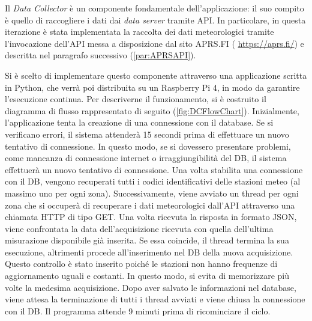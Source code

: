 Il \textit{Data Collector} è un componente fondamentale dell'applicazione: il suo compito è quello di raccogliere i dati dai \textit{data server} tramite API. In particolare, in questa iterazione è stata implementata la raccolta dei dati meteorologici tramite l'invocazione dell'API messa a disposizione dal sito APRS.FI ( \url{https://aprs.fi/}) e descritta nel paragrafo successivo (\ref{par:APRSAPI}). 

Si è scelto di implementare questo componente attraverso una applicazione scritta in Python, che verrà poi distribuita su un Raspberry Pi 4, in modo da garantire l'esecuzione continua. Per descriverne il funzionamento, si è costruito il diagramma di flusso rappresentato di seguito (\Fig\ref{fig:DCFlowChart}). Inizialmente, l'applicazione tenta la creazione di una connessione con il database. Se si verificano errori, il sistema attenderà 15 secondi prima di effettuare un nuovo tentativo di connessione. In questo modo, se si dovessero presentare problemi, come mancanza di connessione internet o irraggiungibilità del DB, il sistema effettuerà un nuovo tentativo di connessione. Una volta stabilita una connessione con il DB, vengono recuperati tutti i codici identificativi delle stazioni meteo (al massimo uno per ogni zona). Successivamente, viene avviato un thread per ogni zona che si occuperà di recuperare i dati meteorologici dall'API attraverso una chiamata HTTP di tipo GET. Una volta ricevuta la risposta in formato JSON, viene confrontata la data dell'acquisizione ricevuta con quella dell'ultima misurazione disponibile già inserita. Se essa coincide, il thread termina la sua esecuzione, altrimenti procede all'inserimento nel DB della nuova acquisizione. Questo controllo è stato inserito poiché le stazioni non hanno frequenze di aggiornamento uguali e costanti. In questo modo, si evita di memorizzare più volte la medesima acquisizione. Dopo aver salvato le informazioni nel database, viene attesa la terminazione di tutti i thread avviati e viene chiusa la connessione con il DB. Il programma attende 9 minuti prima di ricominciare il ciclo. 

